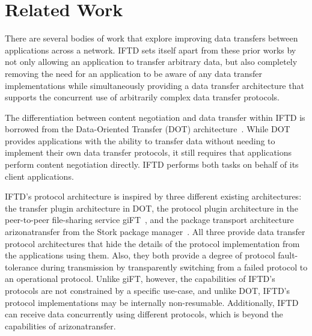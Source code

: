 \section{Related Work}

There are several bodies of work that explore improving data transfers between applications across a network.  IFTD sets itself apart from these prior works by not only allowing an application to transfer arbitrary data, but also completely removing the need for an application to be aware of any data transfer implementations while simultaneously providing a data transfer architecture that supports the concurrent use of arbitrarily complex data transfer protocols.

The differentiation between content negotiation and data transfer within IFTD is borrowed from the Data-Oriented Transfer (DOT) architecture~\cite{dot_paper}.  While DOT provides applications with the ability to transfer data without needing to implement their own data transfer protocols, it still requires that applications perform content negotiation directly.  IFTD performs both tasks on behalf of its client applications.

IFTD's protocol architecture is inspired by three different existing architectures: the transfer plugin architecture in DOT, the protocol plugin architecture in the peer-to-peer file-sharing service giFT~\cite{giFT}, and the package transport architecture arizonatransfer from the Stork package manager~\cite{stork_paper}.  All three provide data transfer protocol architectures that hide the details of the protocol implementation from the applications using them.  Also, they both provide a degree of protocol fault-tolerance during transmission by transparently switching from a failed protocol to an operational protocol.  Unlike giFT, however, the capabilities of IFTD's protocols are not constrained by a specific use-case, and unlike DOT, IFTD's protocol implementations may be internally non-resumable.  Additionally, IFTD can receive data concurrently using different protocols, which is beyond the capabilities of arizonatransfer.

